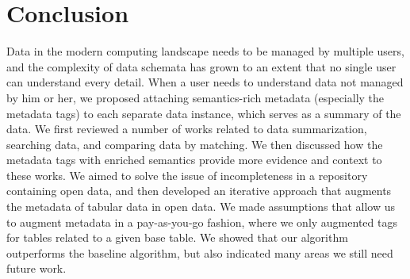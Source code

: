 
\chapter{Conclusion}
\label{ch:Conclusion}

Data in the modern computing landscape needs to be managed by multiple users, and the complexity of data schemata has grown to an extent that no single user can understand every detail. When a user needs to understand data not managed by him or her, we proposed attaching semantics-rich metadata (especially the metadata tags) to each separate data instance, which serves as a summary of the data. We first reviewed a number of works related to data summarization, searching data, and comparing data by matching. We then discussed how the metadata tags with enriched semantics provide more evidence and context to these works. We aimed to solve the issue of incompleteness in a repository containing open data, and then developed an iterative approach that augments the metadata of tabular data in open data. We made assumptions that allow us to augment metadata in a pay-as-you-go fashion, where we only augmented tags for tables related to a given base table. We showed that our algorithm outperforms the baseline algorithm, but also indicated many areas we still need future work.

\endinput